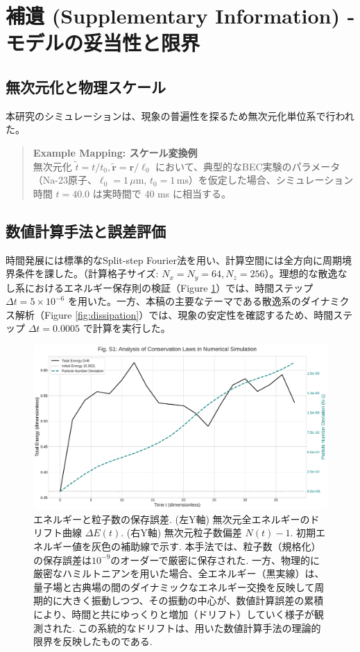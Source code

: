 \documentclass[a4paper,11pt,ja=standard]{bxjsarticle}
\begin{document}
\FloatBarrier
\section{補遺 (Supplementary Information) - モデルの妥当性と限界}

\subsection{無次元化と物理スケール}
本研究のシミュレーションは、現象の普遍性を探るため無次元化単位系で行われた。
\begin{quote}
\textbf{Example Mapping: スケール変換例} \\
無次元化 $\tilde t = t/t_0, \tilde{\mathbf{r}} = \mathbf{r}/\ell_0$ において、典型的なBEC実験のパラメータ（Na-23原子、$\ell_0 = 1\,\mu\text{m}$, $t_0 = 1\,\text{ms}$）を仮定した場合、シミュレーション時間 $t=40.0$ は実時間で 40 ms に相当する。
\end{quote}

\subsection{数値計算手法と誤差評価}
時間発展には標準的なSplit-step Fourier法を用い、計算空間には全方向に周期境界条件を課した。（計算格子サイズ: $N_x=N_y=64, N_z=256$）。理想的な散逸なし系におけるエネルギー保存則の検証（Figure \ref{fig:conservation}）では、時間ステップ $\Delta t = 5\times10^{-6}$ を用いた。一方、本稿の主要なテーマである散逸系のダイナミクス解析（Figure \ref{fig:dissipation}）では、現象の安定性を確認するため、時間ステップ $\Delta t = 0.0005$ で計算を実行した。

\begin{figure}[h!]
  \centering
  \includegraphics[width=0.9\linewidth]{fig1_conservation.pdf}
  \caption{エネルギーと粒子数の保存誤差. (左Y軸) 無次元全エネルギーのドリフト曲線 $\Delta E(t)$. (右Y軸) 無次元粒子数偏差 $N(t)-1$. 初期エネルギー値を灰色の補助線で示す. 本手法では、粒子数（規格化）の保存誤差は$10^{-9}$のオーダーで厳密に保存された. 一方、物理的に厳密なハミルトニアンを用いた場合、全エネルギー（黒実線）は、量子場と古典場の間のダイナミックなエネルギー交換を反映して周期的に大きく振動しつつ、その振動の中心が、数値計算誤差の累積により、時間と共にゆっくりと増加（ドリフト）していく様子が観測された. この系統的なドリフトは、用いた数値計算手法の理論的限界を反映したものである.}
  \label{fig:conservation}
\end{figure}
\end{document}
